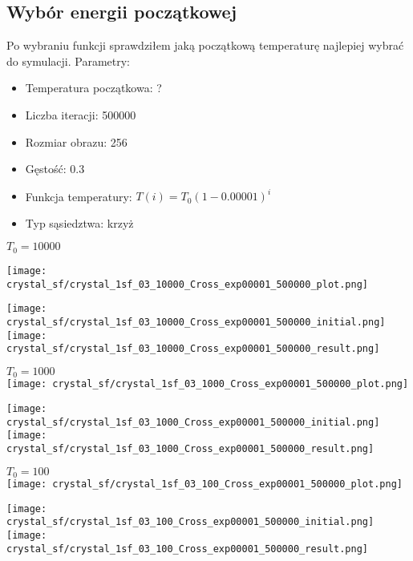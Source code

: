 \subsection{Wybór energii początkowej}
Po wybraniu funkcji sprawdziłem jaką początkową temperaturę najlepiej wybrać do symulacji.
Parametry:
\begin{itemize}
\item Temperatura początkowa: ?
\item Liczba iteracji: 500000
\item Rozmiar obrazu: 256
\item Gęstość: 0.3
\item Funkcja temperatury: $T(i) = T_0(1-0.00001)^{i}$
\item Typ sąsiedztwa: krzyż 
\end{itemize}

$T_0=10000$\\
\begin{minipage}{\textwidth}
\begin{minipage}{.7\linewidth}
  \texttt{[image: crystal\_sf/crystal\_1sf\_03\_10000\_Cross\_exp00001\_500000\_plot.png]}
\end{minipage}%
\begin{minipage}{.3\linewidth}
  \texttt{[image: crystal\_sf/crystal\_1sf\_03\_10000\_Cross\_exp00001\_500000\_initial.png]}
  \texttt{[image: crystal\_sf/crystal\_1sf\_03\_10000\_Cross\_exp00001\_500000\_result.png]}
\end{minipage}
\end{minipage}

\begin{minipage}{\textwidth}
\begin{minipage}{.7\linewidth}
$T_0=1000$\\
  \texttt{[image: crystal\_sf/crystal\_1sf\_03\_1000\_Cross\_exp00001\_500000\_plot.png]}
\end{minipage}%
\begin{minipage}{.3\linewidth}
  \texttt{[image: crystal\_sf/crystal\_1sf\_03\_1000\_Cross\_exp00001\_500000\_initial.png]}
  \texttt{[image: crystal\_sf/crystal\_1sf\_03\_1000\_Cross\_exp00001\_500000\_result.png]}
\end{minipage}
\end{minipage}

\begin{minipage}{\textwidth}
\begin{minipage}{.7\linewidth}
$T_0=100$\\
  \texttt{[image: crystal\_sf/crystal\_1sf\_03\_100\_Cross\_exp00001\_500000\_plot.png]}
\end{minipage}%
\begin{minipage}{.3\linewidth}
  \texttt{[image: crystal\_sf/crystal\_1sf\_03\_100\_Cross\_exp00001\_500000\_initial.png]}
  \texttt{[image: crystal\_sf/crystal\_1sf\_03\_100\_Cross\_exp00001\_500000\_result.png]}
\end{minipage}
\end{minipage}

